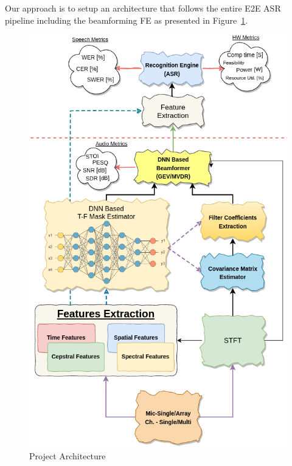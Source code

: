 Our approach is to setup an architecture 
that follows the entire E2E ASR pipeline including
the beamforming FE as presented in
Figure~\ref{fig:proj_blocks}.
\begin{figure}[H]
	\vspace{-2.65cm}
	\centering
	\includegraphics[width=\textwidth]
	{Introduction/images/proj_blocks2}
	\caption{Project Architecture}\label{fig:proj_blocks}
\end{figure}



